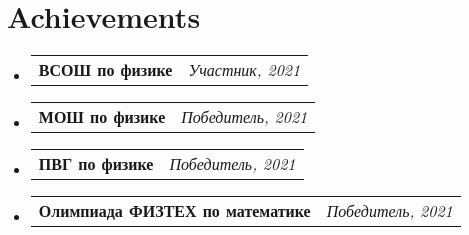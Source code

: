 \documentclass[a4paper,11pt]{article}
\makeatletter
\newcommand{\resumePOR}[3]{
\vspace{0.5mm}\item
    \begin{tabular*}{0.97\textwidth}[t]{l@{\extracolsep{\fill}}r}
        \textbf{#1}\hspace{0.3mm}#2 & \textit{\small{#3}} 
    \end{tabular*}
    \vspace{-2mm}
}
\newcommand{\resumeSubHeadingListStart}{\begin{itemize}[leftmargin=*,labelsep=0mm]}
\newcommand{\resumeSubHeadingListEnd}{\end{itemize}\vspace{2mm}}
\makeatother
\begin{document}
    




\section{\textbf{Achievements}}
\vspace{-0.4mm}
\resumeSubHeadingListStart
\resumePOR{ВСОШ по физике} %
    {} %
    {Участник, 2021} %
    
\resumePOR{МОШ по физике} %
    {} %
    {Победитель, 2021} %
    
\resumePOR{ПВГ по физике} %
    {} %
    {Победитель, 2021} %
    
\resumePOR{Олимпиада ФИЗТЕХ по математике} %
    {} %
    {Победитель, 2021} %
\resumeSubHeadingListEnd
\vspace{-5mm}



\end{document}
